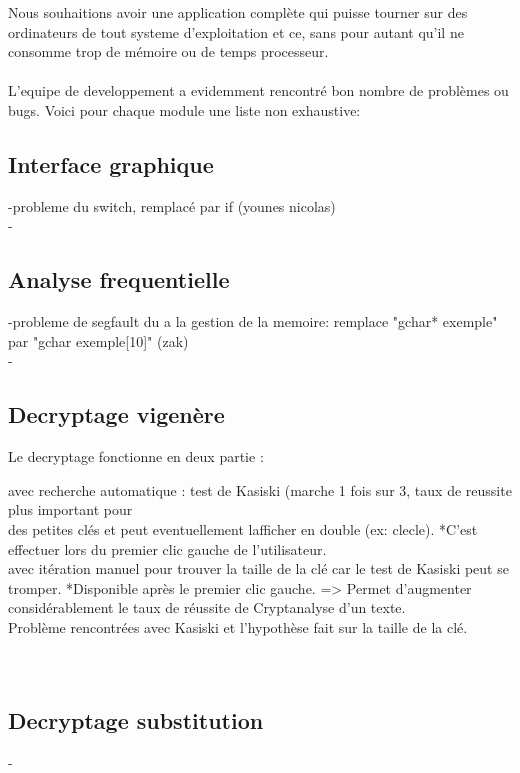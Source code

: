 \documentclass[a4]{article}
\begin{document}
	
	Nous souhaitions avoir une application complète qui puisse tourner sur des ordinateurs 
de tout systeme d'exploitation et ce, sans pour autant qu’il ne
consomme trop de mémoire ou de temps processeur. \\ \\
	
	L'equipe de developpement a evidemment rencontré bon nombre de problèmes ou bugs. Voici pour chaque
	module une liste non exhaustive:
	\subsection{Interface graphique}
	-probleme du switch, remplacé par if (younes nicolas)\\
	-
	\subsection{Analyse frequentielle}
	-probleme de segfault du a la gestion de la memoire: remplace "gchar* exemple" par "gchar exemple[10]" (zak) \\
	-
	\subsection{Decryptage vigenère}
 		Le decryptage fonctionne en deux partie :
		
		avec recherche automatique : test de Kasiski (marche 1 fois sur 3, taux de reussite plus important pour \\
		des petites clés et peut eventuellement lafficher en double (ex: clecle). 
		*C'est effectuer lors du premier clic gauche de l'utilisateur. \\
		
		avec itération manuel pour trouver la taille de la clé car le test de Kasiski peut se tromper.
		*Disponible après le premier clic gauche.
		=> Permet d'augmenter considérablement le taux de réussite de Cryptanalyse d'un texte. \\
 		
		Problème rencontrées avec Kasiski et l'hypothèse fait sur la taille de la clé. \\
 		 \\ \\
	
	\subsection{Decryptage substitution}
	-\\
	
\end{document}
